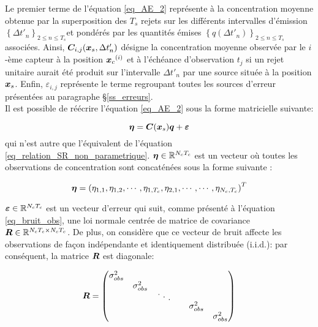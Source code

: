 Le premier terme de l'équation \eqref{eq_AE_2} représente à la concentration moyenne obtenue par la superposition des $T_s$ rejets sur les différents intervalles d'émission $\left\{\Delta t'_n\right\}_{2\leq n \leq T_s}$et pondérés par les quantités émises $\left\{q(\Delta t'_n)\right\}_{2 \leq n \leq T_s}$ associées. Ainsi, ${\bm{C}}_{i,j}({\bm{x}_s}, \Delta t'_n)$ désigne la concentration moyenne observée par le $i$-ème capteur à la position ${\bm{x}_c}^{(i)}$ et à l'échéance d'observation $t_j$ si un rejet unitaire aurait été produit sur l'intervalle $\Delta t'_n$ par une source située à la position ${\bm{x}_s}$. Enfin, $\varepsilon_{i,j}$ représente le terme regroupant toutes les sources d'erreur présentées au paragraphe §\ref{ss_erreurs}.\\

Il est possible de réécrire l'équation \eqref{eq_AE_2} sous la forme matricielle suivante:

\begin{equation}
{\bm{\eta}} = {\bm{C}}({\bm{x}_s}){\bm{q}} + {\bm{\varepsilon}}
\label{eq_AE_3}
\end{equation}
qui n'est autre que l'équivalent de l'équation \eqref{eq_relation_SR_non_parametrique}. ${\bm{\eta}} \in \mathbb{R}^{N_cT_c}$ est un vecteur où toutes les observations de concentration sont concaténées sous la forme suivante : 

\begin{equation}
{\bm{\eta}} = \left({\eta}_{1,1}, {\eta}_{1,2}, \cdots, {\eta}_{1,T_c}, {\eta}_{2,1}, \cdots, \cdots, {\eta}_{N_c,T_c}\right)^T
\label{eq_AE_3_plus}
\end{equation}

${\bm{\varepsilon}} \in \mathbb{R}^{N_cT_c}$ est un vecteur d'erreur qui suit, comme présenté à l'équation \eqref{eq_bruit_obs}, une loi normale centrée de matrice de covariance ${\bm{R}} \in \mathbb{R}^{N_cT_c \times N_cT_c}$. De plus, on considère que ce vecteur de bruit affecte les observations de façon indépendante et identiquement distribuée (i.i.d.): par conséquent, la matrice ${\bm{R}}$ est diagonale:


\begin{equation}
\MatR = 
\begin{pmatrix}
\diagentry{\varObs}\\
&\diagentry{\varObs}\\
&&\diagentry{\xddots}\\
&&&&\diagentry{\varObs}\\
&&&&&\diagentry{\varObs}\\
\end{pmatrix}
\label{eq_AE_covariance_obs}
\end{equation}

